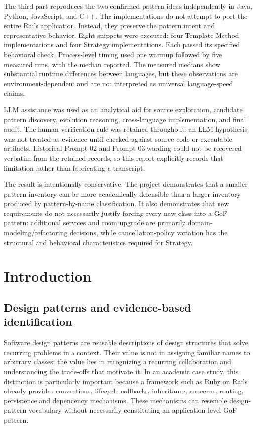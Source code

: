 \documentclass[10pt,a4paper]{article}
\begin{document}
The third part reproduces the two confirmed pattern ideas independently in Java, Python, JavaScript, and C++. The implementations do not attempt to port the entire Rails application. Instead, they preserve the pattern intent and representative behavior. Eight snippets were executed: four Template Method implementations and four Strategy implementations. Each passed its specified behavioral check. Process-level timing used one warmup followed by five measured runs, with the median reported. The measured medians show substantial runtime differences between languages, but these observations are environment-dependent and are not interpreted as universal language-speed claims.

LLM assistance was used as an analytical aid for source exploration, candidate pattern discovery, evolution reasoning, cross-language implementation, and final audit. The human-verification rule was retained throughout: an LLM hypothesis was not treated as evidence until checked against source code or executable artifacts. Historical Prompt 02 and Prompt 03 wording could not be recovered verbatim from the retained records, so this report explicitly records that limitation rather than fabricating a transcript.

The result is intentionally conservative. The project demonstrates that a smaller pattern inventory can be more academically defensible than a larger inventory produced by pattern-by-name classification. It also demonstrates that new requirements do not necessarily justify forcing every new class into a GoF pattern: additional services and room upgrade are primarily domain-modeling/refactoring decisions, while cancellation-policy variation has the structural and behavioral characteristics required for Strategy.

\section{Introduction}

\subsection{Design patterns and evidence-based identification}

Software design patterns are reusable descriptions of design structures that solve recurring problems in a context. Their value is not in assigning familiar names to arbitrary classes; the value lies in recognizing a recurring collaboration and understanding the trade-offs that motivate it. In an academic case study, this distinction is particularly important because a framework such as Ruby on Rails already provides conventions, lifecycle callbacks, inheritance, concerns, routing, persistence and dependency mechanisms. These mechanisms can resemble design-pattern vocabulary without necessarily constituting an application-level GoF pattern.
\end{document}
